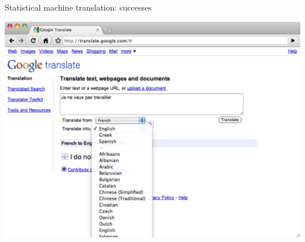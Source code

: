 \documentclass{beamer}
\begin{document}
\begin{frame}[t]{Statistical machine translation: successes}
\begin{center}
  \includegraphics[scale=0.35]{GoogleTranslateLanguages.pdf}
\end{center}
\end{frame}
\end{document}
